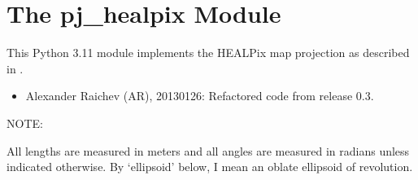 \documentclass[a4paper,12ptopenany,oneside,english]{sphinxmanual}
\begin{document}
\sphinxstepscope


\chapter{The pj\_healpix Module}
\label{\detokenize{pj_healpix:module-rhealpixdggs.pj_healpix}}\label{\detokenize{pj_healpix:the-pj-healpix-module}}\label{\detokenize{pj_healpix::doc}}
\sphinxAtStartPar
This Python 3.11 module implements the HEALPix map projection as described in .
\begin{itemize}
\item {} 
\sphinxAtStartPar
Alexander Raichev (AR), 2013\sphinxhyphen{}01\sphinxhyphen{}26: Refactored code from release 0.3.

\end{itemize}

\sphinxAtStartPar
NOTE:

\sphinxAtStartPar
All lengths are measured in meters and all angles are measured in radians
unless indicated otherwise.
By ‘ellipsoid’ below, I mean an oblate ellipsoid of revolution.
\end{document}
